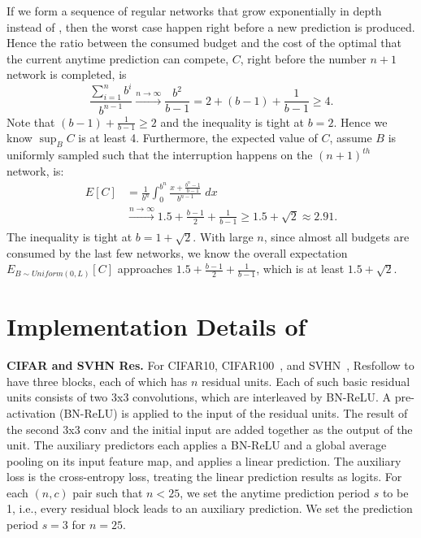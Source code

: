 If we form a sequence of regular networks that grow exponentially in depth instead of \ann, then the worst case happen right before a new prediction is produced. Hence the ratio between the consumed budget and the cost of the optimal that the current anytime prediction can compete, $C$, right before the number $n+1$ network is completed, is 
\[
    \frac{\sum _{i=1}^n b^i}{b^{n-1}} \xrightarrow[]{n\rightarrow \infty} \frac{b^2}{b-1} = 2 + (b-1) + \frac{1}{b-1} \geq 4. 
\]
Note that $(b-1) + \frac{1}{b-1} \geq 2$ and the inequality is tight at $b=2$. Hence we know $\sup _B {C}$ is at least 4. Furthermore, the expected value of $C$, assume $B$ is uniformly sampled such that the interruption happens on the $(n+1)^{th}$ network, is:
\begin{align*}
    E[C] &= \frac{1}{b^{n}} \int _0 ^{b^{n}} \frac{x + \frac{b^{n}-1}{b-1}}{b^{n-1}} \; dx \\ &\xrightarrow[]{n\rightarrow \infty} 1.5 + \frac{b-1}{2} + \frac{1}{b-1} \geq 1.5 + \sqrt{2} \approx 2.91.
\end{align*}
The inequality is tight at $b = 1 + \sqrt{2}$. With large $n$, since almost all budgets are consumed by the last few networks, we know the overall expectation $E_{B\sim Uniform(0, L)}[C]$ approaches $1.5 + \frac{b-1}{2} + \frac{1}{b-1}$, which is at least $1.5 + \sqrt{2}$.




\section{Implementation Details of \anns}
\label{sec:implementation_ann}


\textbf{CIFAR and SVHN Res\anns.} For CIFAR10, CIFAR100~\cite{cifar}, and SVHN~\cite{svhn}, Res\ann follow \cite{resnet} to have three blocks, each of which has $n$ residual units. Each of such basic residual units consists of two 3x3 convolutions, which are interleaved by BN-ReLU. A pre-activation (BN-ReLU) is applied to the input of the residual units. The result of the second 3x3 conv and the initial input are added together as the output of the unit. The auxiliary predictors each applies a BN-ReLU and a global average pooling on its input feature map, and applies a linear prediction. The auxiliary loss is the cross-entropy loss, treating the linear prediction results as logits. For each $(n,c)$ pair such that $n < 25$, we set the anytime prediction period $s$ to be 1, i.e., every residual block leads to an auxiliary prediction. We set the prediction period $s=3$ for $n=25$. 


